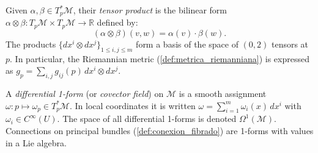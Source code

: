 \begin{definition}\label{def:producto_tensorial_covectores}
Given $\alpha, \beta \in T_p^*\mathcal{M}$, their \textit{tensor product} is the bilinear form $\alpha \otimes \beta: T_p\mathcal{M} \times T_p\mathcal{M} \to \mathbb{R}$ defined by:
\[
(\alpha \otimes \beta)(v, w) = \alpha(v) \cdot \beta(w).
\]
The products $\{dx^i \otimes dx^j\}_{1 \leq i,j \leq m}$ form a basis of the space of $(0,2)$ tensors at $p$. In particular, the Riemannian metric (\autoref{def:metrica_riemanniana}) is expressed as $g_p = \sum_{i,j} g_{ij}(p) \, dx^i \otimes dx^j$.
\end{definition}

\begin{definition}\label{def:1_forma_diferencial}
A \textit{differential 1-form} (or \textit{covector field}) on $\mathcal{M}$ is a smooth assignment $\omega: p \mapsto \omega_p \in T_p^*\mathcal{M}$. In local coordinates it is written $\omega = \sum_{i=1}^m \omega_i(x) \, dx^i$ with $\omega_i \in C^\infty(U)$. The space of all differential 1-forms is denoted $\Omega^1(\mathcal{M})$. Connections on principal bundles (\autoref{def:conexion_fibrado}) are 1-forms with values in a Lie algebra.
\end{definition}

